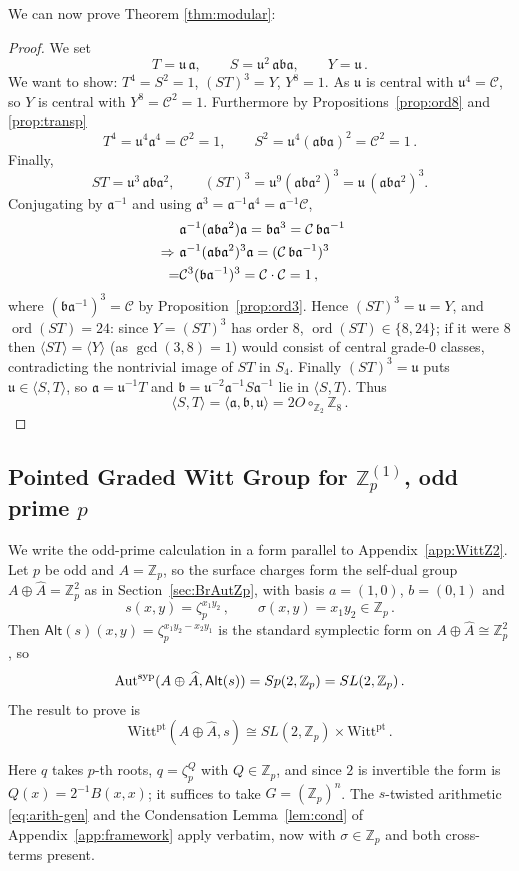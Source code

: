 \documentclass[aps,twocolumn,prx,floatfix,preprintnumbers, nofootinbib,10pt]{revtex4-2}
\numberwithin{equation}{section}
\theoremstyle{definition}
\theoremstyle{remark}
\theoremstyle{claim}
\newcommand{\Perm}{S}
\newcommand{\be}{\begin{equation}}
\newcommand{\ee}{\end{equation}}
\newcommand{\ba}{\begin{aligned}}
\newcommand{\ea}{\end{aligned}}
\newcommand{\Aut}{\operatorname{Aut}}
\newcommand{\ord}{\operatorname{ord}}
\newcommand{\ga}{\mathfrak{a}}
\newcommand{\gb}{\mathfrak{b}}
\newcommand{\gu}{\mathfrak{u}}
\newcommand{\Z}{{\mathbb Z}}
\newcommand{\cC}{\mathcal{C}}
\newcommand{\Witt}{\text{Witt}}
\newcommand{\pt}{\text{pt}}
\begin{document}
We can now prove Theorem \ref{thm:modular}:
\begin{proof}
We set 
\be 
T=\gu\,\ga,\qquad S=\gu^{2}\,\ga\gb\ga,\qquad Y=\gu \,.
\ee
We want to show: $T^4=S^2=1$, $(ST)^3=Y$, $Y^8=1$. 
As $\gu$ is central with $\gu^4=\cC$, so $Y$ is
central with $Y^8=\cC^2=1$. Furthermore by Propositions~\ref{prop:ord8} and \ref{prop:transp}
\be
  T^4=\gu^4\ga^4=\cC^2=1,\qquad
  S^2=\gu^4(\ga\gb\ga)^2=\cC^2=1 \,.
\ee
Finally, 
\be
  ST=\gu^{3}\,\ga\gb\ga^2,\qquad (ST)^3=\gu^{9}(\ga\gb\ga^2)^3=\gu\,(\ga\gb\ga^2)^3 .
\ee
Conjugating by $\ga^{-1}$ and using $\ga^3=\ga^{-1}\ga^4=\ga^{-1} \cC$,
\be\ba 
  &\ga^{-1}(\ga\gb\ga^2)\ga=\gb\ga^{3}=\cC\,\gb\ga^{-1}
 \cr  
 \Rightarrow\ &
{\ga^{-1}} (\ga\gb\ga^2)^3 \ga
 =(\cC\,\gb\ga^{-1})^3 \cr 
  = &\cC^{3}(\gb\ga^{-1})^3
 =\cC\cdot\cC=1 \,,\cr 
\ea\ee
where $(\gb\ga^{-1})^3=\cC$ by Proposition~\ref{prop:ord3}. Hence $(ST)^3=\gu=Y$, and
$\ord(ST)=24$: since $Y=(ST)^3$ has order $8$, $\ord(ST)\in\{8,24\}$; if it were $8$
then $\langle ST\rangle=\langle Y\rangle$ (as $\gcd(3,8)=1$) would consist of central grade-$0$ classes, contradicting the nontrivial image of $ST$ in $\Perm_4$. Finally $(ST)^3=\gu$ puts $\gu\in\langle S,T\rangle$, so $\ga=\gu^{-1}T$ and
$\gb=\gu^{-2}\ga^{-1}S\ga^{-1}$ lie in $\langle S,T\rangle$. Thus
\be 
\langle S,T\rangle=\langle\ga,\gb,\gu\rangle=2O\circ_{\Z_2}\Z_8\,.
\ee
\end{proof}



\subsection{Pointed Graded Witt Group for $\Z_p^{(1)}$, odd prime $p$}
\label{app:WittZp}


We write the odd-prime calculation in a form parallel to Appendix~\ref{app:WittZ2}.
Let $p$ be odd and $A=\Z_p$, so the surface charges form the self-dual group
$A\oplus\widehat A=\Z_p^2$ as in Section~\ref{sec:BrAutZp}, with basis $a=(1,0)$,
$b=(0,1)$ and
\be
  s(x,y)=\zeta_p^{x_1y_2}\,,\qquad
  \sigma(x,y)=x_1y_2\in\Z_p \,.
\ee
Then $\mathsf{Alt}(s)(x,y)=\zeta_p^{x_1y_2-x_2y_1}$ is the standard symplectic
form on $A\oplus\widehat A\cong\Z_p^2$, so
\be
  \Aut^{\rm syp}(A\oplus\widehat A,\mathsf{Alt}(s))
  =Sp(2,\Z_p)=SL(2,\Z_p) \,.
\ee
The result to prove is
\be\label{eq:WittZp-goal}
  \Witt^\pt(A\oplus\widehat A,s)\cong SL(2,\Z_p)\times\Witt^\pt \,.
\ee

\bigskip{}
Here $q$ takes $p$-th roots, $q=\zeta_p^Q$ with $Q\in\Z_p$, and since $2$
is invertible the form is $Q(x)=2^{-1}B(x,x)$; it suffices to take
$G=(\Z_p)^n$. The $s$-twisted arithmetic \eqref{eq:arith-gen} and the
Condensation Lemma~\ref{lem:cond} of Appendix~\ref{app:framework} apply verbatim,
now with $\sigma\in\Z_p$ and both cross-terms present.
\end{document}
